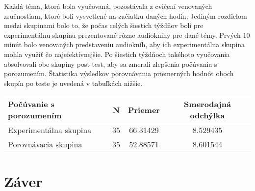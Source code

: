 \documentclass[10pt,twoside,slovak,a4paper]{article}
\begin{document}
Každá téma, ktorá bola vyučovaná, pozostávala z cvičení venovaných zručnostiam, ktoré boli vysvetlené na začiatku daných hodín. Jediným rozdielom medzi skupinami bolo to, že počas celých šiestich týždňov boli pre experimentálnu skupinu prezentované rôzne audioknihy pre dané témy. Prvých 10 minút bolo venovaných predstaveniu audiokníh, aby ich experimentálna skupina mohla využiť čo najefektívnejšie. Po šiestich týždňoch takéhoto vyučovania absolvovali obe skupiny post-test, aby sa zmerali zlepšenia počúvania s porozumením. Štatistika výsledkov porovnávania priemerných hodnôt oboch skupín po teste je uvedená v tabuľkách nižšie.\\




\begin{table}[tbh]
\centering
\begin{tabular}{@{}|l|c|c|c|@{}}
\toprule
Počúvanie s porozumením & N  & Priemer  & Smerodajná odchýlka \\ \midrule
Experimentálna skupina  & 35 & 66.31429 & 8.529435            \\ \midrule
Porovnávacia skupina    & 35 & 52.88571 & 8.601544            \\ \bottomrule
\end{tabular}
\end{table}



\section{Záver} \label{zaver} %






\end{document}
